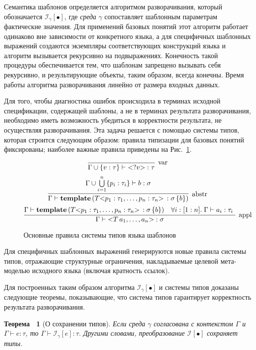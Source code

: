 \documentclass[12pt,a4paper]{article}
\newcommand{\figref}[1]{Рис.~\ref{#1}}
\newcommand{\term}[1]{\emph{#1}}
\theoremstyle{definition}
\theoremstyle{plain}
\newtheorem{Th}{Теорема~}[part]
\newcommand{\Inst}[2]{\mathcal{I}_{#1} \left[ #2 \right]}%
\newcommand{\trule}[3]{%
\infer[\mbox{#3}]{#2}{#1}%
}
\newcommand{\ang}[1]{\mathsf{<}#1\mathsf{>}}
\begin{document}
Семантика шаблонов определяется алгоритмом разворачивания, который обозначается $\Inst{\gamma}{\bullet}$, где \term{среда} $\gamma$ сопоставляет шаблонным параметрам фактические значения. Для применений базовых понятий этот алгоритм работает одинаково вне зависимости от конкретного языка, а для специфичных шаблонных выражений создаются экземпляры соответствующих конструкций языка и алгоритм вызывается рекурсивно на подвыражениях. Конечность такой процедуры обеспечивается тем, что шаблонам запрещено вызывать себя рекурсивно, и результирующие объекты, таким образом, всегда конечны. Время работы алгоритма разворачивания линейно от размера входных данных.

Для того, чтобы диагностика ошибок происходила в терминах исходной спецификации, содержащей шаблоны, а не в терминах результата разворачивания, необходимо иметь возможность убедиться в корректности результата, не осуществляя разворачивания. Эта задача решается с помощью системы типов, которая строится следующим образом: правила типизации для базовых понятий фиксированы; наиболее важные правила приведены на \figref{TmpTypes}.
\begin{figure}[htbp]
	\centering
$$
\trule{}{\Gamma \cup \{v : \tau\} \vdash \ang{?v} : \tau}{var}
$$ 
$$
\trule{
	\Gamma \cup \bigcup\limits_{i=1}^{n} \{ p_i : \tau_i \} \vdash b : \sigma
}{
	\Gamma \vdash \mathbf{template}\left(
		T \ang{p_1 : \tau_1, \ldots, p_n : \tau_n} \,: \sigma \, \{ b \}
	\right)
}{abstr}
$$ 
$$
\trule{
	\Gamma \vdash \mathbf{template}\left(
		T \ang{p_1 : \tau_1, \ldots, p_n : \tau_n} \,: \sigma \, \{ b \}
	\right)
	&
	\forall i : [1:n].\; \Gamma \vdash a_i : \tau_i \
}{
	\Gamma \vdash \ang{T \, a_1, \ldots, a_n} : \sigma
}{appl}
$$
	\caption{Основные правила системы типов языка шаблонов}\label{TmpTypes}
\end{figure}
Для специфичных шаблонных выражений генерируются новые правила системы типов, отражающие структурные ограничения, накладываемые целевой мета-моделью исходного языка (включая кратность ссылок).

Для построенных таким образом алгоритма $\Inst{\gamma}{\bullet}$ и системы типов доказаны следующие теоремы, показывающие, что система типов гарантирует корректность результата разворачивания.

\begin{Th}[О сохранении типов]
Если среда $\gamma$ согласована с контекстом $\Gamma$ и $\Gamma \vdash e : \tau$, то $\Gamma \vdash \Inst{\gamma}{e} : \tau$. Другими словами, преобразование $\Inst{}{\bullet}$ сохраняет типы.
\end{Th}
\end{document}
